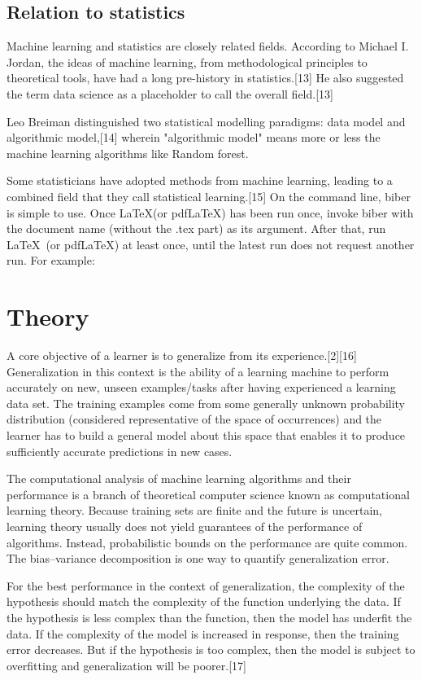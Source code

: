 \documentclass[utf8,bachelor,english]{gradu3}
\begin{document}
\section{Relation to statistics}

Machine learning and statistics are closely related fields. According to Michael I. Jordan, the ideas of machine learning, from methodological principles to theoretical tools, have had a long pre-history in statistics.[13] He also suggested the term data science as a placeholder to call the overall field.[13]

Leo Breiman distinguished two statistical modelling paradigms: data model and algorithmic model,[14] wherein "algorithmic model" means more or less the machine learning algorithms like Random forest.

Some statisticians have adopted methods from machine learning, leading to a combined field that they call statistical learning.[15]
On the command line, biber is simple to use.  Once \LaTeX (or
pdf\LaTeX) has been run once, invoke biber with the document name
(without the .tex part) as its argument.  After that, run \LaTeX\ (or
pdf\LaTeX) at least once, until the latest run does not request
another run.  For example:

\chapter{Theory}

A core objective of a learner is to generalize from its experience.[2][16] Generalization in this context is the ability of a learning machine to perform accurately on new, unseen examples/tasks after having experienced a learning data set. The training examples come from some generally unknown probability distribution (considered representative of the space of occurrences) and the learner has to build a general model about this space that enables it to produce sufficiently accurate predictions in new cases.

The computational analysis of machine learning algorithms and their performance is a branch of theoretical computer science known as computational learning theory. Because training sets are finite and the future is uncertain, learning theory usually does not yield guarantees of the performance of algorithms. Instead, probabilistic bounds on the performance are quite common. The bias–variance decomposition is one way to quantify generalization error.

For the best performance in the context of generalization, the complexity of the hypothesis should match the complexity of the function underlying the data. If the hypothesis is less complex than the function, then the model has underfit the data. If the complexity of the model is increased in response, then the training error decreases. But if the hypothesis is too complex, then the model is subject to overfitting and generalization will be poorer.[17]
\end{document}
